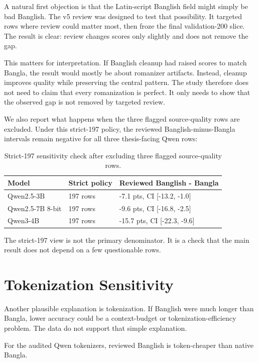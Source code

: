 A natural first objection is that the Latin-script Banglish field might simply be bad Banglish. The v5 review was designed to test that possibility. It targeted rows where review could matter most, then froze the final validation-200 slice. The result is clear: review changes scores only slightly and does not remove the gap.

This matters for interpretation. If Banglish cleanup had raised scores to match Bangla, the result would mostly be about romanizer artifacts. Instead, cleanup improves quality while preserving the central pattern. The study therefore does not need to claim that every romanization is perfect. It only needs to show that the observed gap is not removed by targeted review.

We also report what happens when the three flagged source-quality rows are excluded. Under this strict-197 policy, the reviewed Banglish-minus-Bangla intervals remain negative for all three thesis-facing Qwen rows:

\begin{table}[H]
\centering
\caption{Strict-197 sensitivity check after excluding three flagged source-quality rows.}
\label{tab:strict197}
\small
\begin{tabular}{lll}
\hline
Model & Strict policy & Reviewed Banglish - Bangla \\
\hline
Qwen2.5-3B & 197 rows & -7.1 pts, CI [-13.2, -1.0] \\
Qwen2.5-7B 8-bit & 197 rows & -9.6 pts, CI [-16.8, -2.5] \\
Qwen3-4B & 197 rows & -15.7 pts, CI [-22.3, -9.6] \\
\hline
\end{tabular}%
\end{table}

The strict-197 view is not the primary denominator. It is a check that the main result does not depend on a few questionable rows.

\section{Tokenization Sensitivity}

Another plausible explanation is tokenization. If Banglish were much longer than Bangla, lower accuracy could be a context-budget or tokenization-efficiency problem. The data do not support that simple explanation.

For the audited Qwen tokenizers, reviewed Banglish is token-cheaper than native Bangla.

